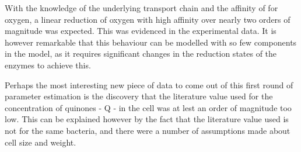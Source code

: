 With the knowledge of the underlying transport chain and the affinity of \cbbthree{} for oxygen, a linear reduction of oxygen with high affinity over nearly two orders of magnitude was expected. This was evidenced in the experimental data. It is however remarkable that this behaviour can be modelled with so few components in the model, as it requires significant changes in the reduction states of the enzymes to achieve this.

Perhaps the most interesting new piece of data to come out of this first round of parameter estimation is the discovery that the literature value used for the concentration of quinones - Q - in the cell was at lest an order of magnitude too low. This can be explained however by the fact that the literature value used is not for the same bacteria, and there were a number of assumptions made about \Nsm{} cell size and weight.
